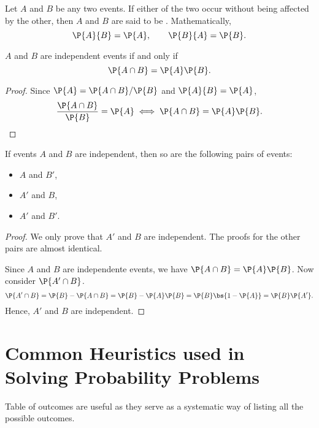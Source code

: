 \begin{definition}
    Let $A$ and $B$ be any two events. If either of the two occur without being affected by the other, then $A$ and $B$ are said to be . Mathematically, \[\P{A}{B} = \P{A}, \qquad \P{B}{A} = \P{B}.\]
\end{definition}

\begin{proposition}
    $A$ and $B$ are independent events if and only if \[\P{A \cap B} = \P{A}\P{B}.\]
\end{proposition}
\begin{proof}
    Since $\P{A} = \P{A \cap B} / \P{B}$ and $\P{A}{B} = \P{A}$, \[\frac{\P{A \cap B}}{\P{B}} = \P{A} \iff \P{A \cap B} = \P{A}\P{B}.\]
\end{proof}

\begin{proposition}
    If events $A$ and $B$ are independent, then so are the following pairs of events:
    \begin{itemize}
        \item $A$ and $B'$,
        \item $A'$ and $B$,
        \item $A'$ and $B'$.
    \end{itemize}
\end{proposition}
\begin{proof}
    We only prove that $A'$ and $B$ are independent. The proofs for the other pairs are almost identical.

    Since $A$ and $B$ are independente events, we have $\P{A \cap B} = \P{A} \P{B}$. Now consider $\P{A' \cap B}$. \[\P{A' \cap B} = \P{B} - \P{A \cap B} = \P{B} - \P{A}\P{B} = \P{B} \bs{1 - \P{A}} = \P{B} \P{A'}.\] Hence, $A'$ and $B$ are independent.
\end{proof}

\section{Common Heuristics used in Solving Probability Problems}

\begin{recipe}
    Table of outcomes are useful as they serve as a systematic way of listing all the possible outcomes.
\end{recipe}

